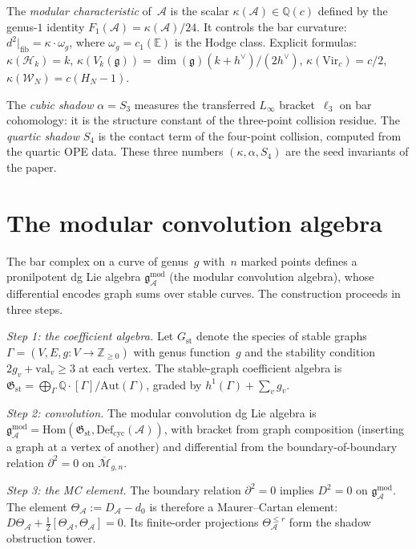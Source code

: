 \documentclass[11pt,reqno]{amsart}
\theoremstyle{definition}
\theoremstyle{remark}
\newcommand{\cA}{\mathcal{A}}
\newcommand{\cM}{\mathcal{M}}
\newcommand{\Defcyc}{\mathrm{Def}_{\mathrm{cyc}}}
\newcommand{\Hom}{\mathrm{Hom}}
\newcommand{\fg}{\mathfrak{g}}
\newcommand{\gmod}{\mathfrak{g}^{\mathrm{mod}}_\cA}
\newcommand{\Vir}{\mathrm{Vir}}
\newcommand{\cW}{\mathcal{W}}
\numberwithin{equation}{section}
\begin{document}
The \emph{modular characteristic} of~$\cA$ is the scalar
$\kappa(\cA) \in \mathbb{Q}(c)$ defined by the genus-$1$
identity $F_1(\cA) = \kappa(\cA)/24$. It controls the
bar curvature: $d^2|_{\text{fib}} = \kappa \cdot \omega_g$,
where $\omega_g = c_1(\mathbb{E})$ is the Hodge class.
Explicit formulas: $\kappa(\mathcal{H}_k) = k$,
$\kappa(V_k(\fg)) = \dim(\fg)(k + h^\vee)/(2h^\vee)$,
$\kappa(\Vir_c) = c/2$, $\kappa(\cW_N) = c(H_N - 1)$.

The \emph{cubic shadow} $\alpha = S_3$ measures the transferred
$L_\infty$ bracket~$\ell_3$ on bar cohomology: it is the
structure constant of the three-point collision residue. The
\emph{quartic shadow} $S_4$ is the contact term of the
four-point collision, computed from the quartic OPE data.
These three numbers $(\kappa, \alpha, S_4)$ are the seed
invariants of the paper.

\section{The modular convolution algebra}
\label{sec:convolution}

The bar complex on a curve of genus~$g$ with~$n$ marked points
defines a pronilpotent dg Lie algebra
$\gmod$ (the modular convolution algebra), whose differential
encodes graph sums over stable curves. The construction proceeds
in three steps.

\emph{Step 1: the coefficient algebra.}
Let $G_{\mathrm{st}}$ denote the species of stable graphs
$\Gamma = (V, E, g \colon V \to \mathbb{Z}_{\ge 0})$ with
genus function~$g$ and the stability condition
$2g_v + \mathrm{val}_v \ge 3$ at each vertex. The stable-graph
coefficient algebra is
$\mathfrak{G}_{\mathrm{st}} = \bigoplus_\Gamma
\mathbb{Q} \cdot [\Gamma] / \mathrm{Aut}(\Gamma)$,
graded by $h^1(\Gamma) + \sum_v g_v$.

\emph{Step 2: convolution.}
The modular convolution dg Lie algebra is
$\gmod = \Hom(\mathfrak{G}_{\mathrm{st}}, \Defcyc(\cA))$,
with bracket from graph composition (inserting a graph at a
vertex of another) and differential from the boundary-of-boundary
relation $\partial^2 = 0$ on $\overline{\cM}_{g,n}$.

\emph{Step 3: the MC element.}
The boundary relation $\partial^2 = 0$ implies $D^2 = 0$ on
$\gmod$. The element $\Theta_\cA := D_\cA - d_0$ is
therefore a Maurer--Cartan element:
$D\Theta_\cA + \tfrac{1}{2}[\Theta_\cA, \Theta_\cA] = 0$.
Its finite-order projections $\Theta_\cA^{\le r}$ form the
shadow obstruction tower.
\end{document}

